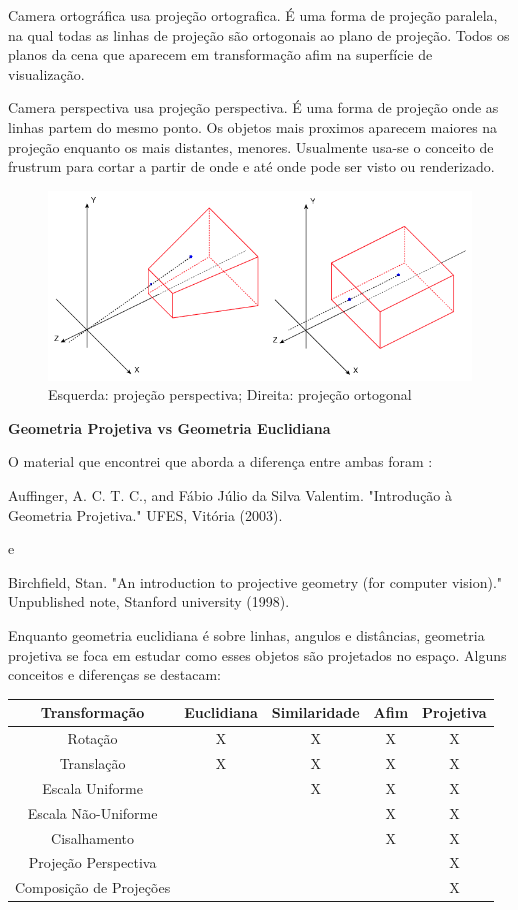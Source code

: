 \documentclass[a4paper]{sbgames}               %
\begin{document}
Camera ortográfica usa projeção ortografica. É uma forma de projeção paralela, na qual todas as linhas de projeção são ortogonais ao plano de projeção. Todos os planos da cena que aparecem em transformação afim na superfície de visualização.

Camera perspectiva usa projeção perspectiva. É uma forma de projeção onde as linhas partem do mesmo ponto. Os objetos mais proximos aparecem maiores na projeção enquanto os mais distantes, menores. Usualmente usa-se o conceito de frustrum para cortar a partir de onde e até onde pode ser visto ou renderizado.

\begin{figure} [h!]
  \centering 
  \includegraphics[width=0.95\linewidth]{imgs/persp}
 \caption{Esquerda: projeção perspectiva; Direita: projeção ortogonal} 
 \label{fig:burstgoogle} 
\end{figure}
\pagebreak

\textbf{Geometria Projetiva vs Geometria Euclidiana} 

O material que encontrei que aborda a diferença entre ambas foram \cite{auffinger2003introduccao} \cite{birchfield1998introduction}: 

Auffinger, A. C. T. C., and Fábio Júlio da Silva Valentim. "Introdução à Geometria Projetiva." UFES, Vitória (2003).

e

Birchfield, Stan. "An introduction to projective geometry (for computer vision)." Unpublished note, Stanford university (1998).

Enquanto geometria euclidiana é sobre linhas, angulos e distâncias, geometria projetiva se foca em estudar como esses objetos são projetados no espaço. Alguns conceitos e diferenças se destacam:

\begin{center}
\begin{tabular}{ c | c c c c }
\hline
 Transformação & Euclidiana & Similaridade & Afim & Projetiva \\ 
 \hline
 Rotação & X & X & X & X \\  
 Translação & X & X & X & X \\  
 Escala Uniforme &  & X & X & X \\  
 Escala Não-Uniforme &  &  & X & X \\  
 Cisalhamento &  &  & X & X \\ 
 Projeção Perspectiva &  &  &  & X \\ 
 Composição de Projeções &  &  &  & X \\ 
\hline
\end{tabular}
\end{center}
\end{document}
